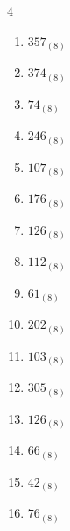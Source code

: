 \begin{multicols}{4}
\begin{enumerate}
  \item $357_{(8)}$

        \phantom{$=239$}

  \item $374_{(8)}$

        \phantom{$=252$}

  \item $74_{(8)}$

        \phantom{$=60$}

  \item $246_{(8)}$

        \phantom{$=166$}

  \item $107_{(8)}$

        \phantom{$=71$}

  \item $176_{(8)}$

        \phantom{$=126$}

  \item $126_{(8)}$

        \phantom{$=86$}

  \item $112_{(8)}$

        \phantom{$=74$}

  \item $61_{(8)}$

        \phantom{$=49$}

  \item $202_{(8)}$

        \phantom{$=130$}

  \item $103_{(8)}$

        \phantom{$=67$}

  \item $305_{(8)}$

        \phantom{$=197$}

  \item $126_{(8)}$

        \phantom{$=86$}

\columnbreak %

  \item $66_{(8)}$

        \phantom{$=54$}

  \item $42_{(8)}$

        \phantom{$=34$}

  \item $76_{(8)}$


\end{enumerate}
\end{multicols}
